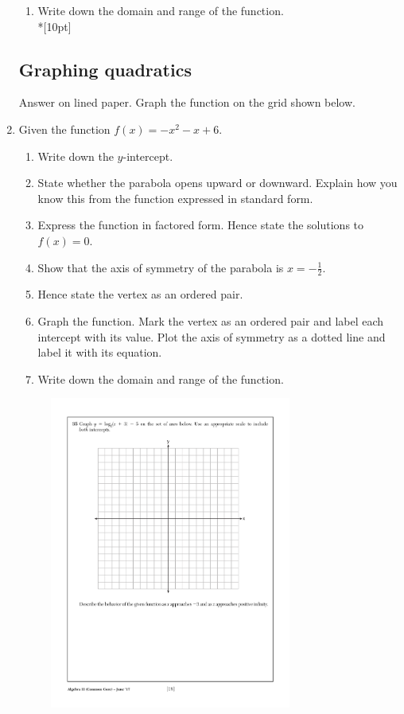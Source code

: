 \documentclass[]{book}
\begin{document}
\begin{enumerate}
\begin{enumerate}
    \item Write down the domain and range of the function.\\*[10pt]
\end{enumerate}


\newpage
\subsection*{Graphing quadratics}
Answer on lined paper. Graph the function on the grid shown below.
\item Given the function $f(x)=-x^2-x+6$. 
\begin{enumerate}
    \item Write down the $y$-intercept.
    \item State whether the parabola opens upward or downward. Explain how you know this from the function expressed in standard form.
    \item Express the function in factored form. Hence state the solutions to $f(x)=0$.
    \item Show that the axis of symmetry of the parabola is $x=-\frac{1}{2}$.
    \item Hence state the vertex as an ordered pair. 
    \item Graph the function. Mark the vertex as an ordered pair and label each intercept with its value. Plot the axis of symmetry as a dotted line and label it with its equation.
    \item Write down the domain and range of the function.
\end{enumerate}

\begin{figure}[!ht]
    \centering
    \includegraphics[width=0.75\textwidth]{regents-grid.pdf}
\end{figure}


\end{enumerate}
\end{document}
